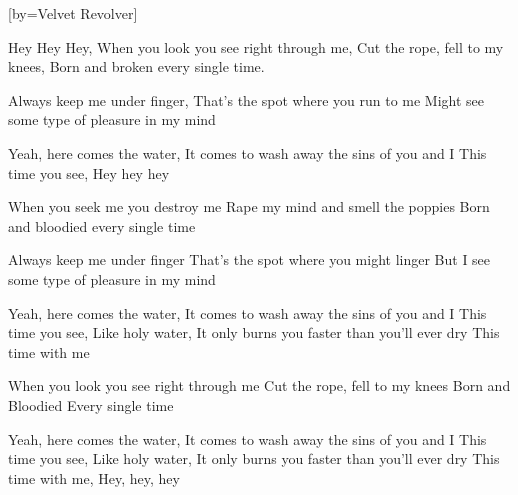 

[by=Velvet Revolver]


\beginverse
Hey Hey Hey, When you look you see right through me,
Cut the rope, fell to my knees, Born and broken every single time.

Always keep me under finger, That's the spot where you run to me
Might see some type of pleasure in my mind
\endverse

\beginverse
Yeah, here comes the water, It comes to wash away the sins of you and I
This time you see, Hey hey hey
\endverse

\beginverse
When you seek me you destroy me
Rape my mind and smell the poppies
Born and bloodied every single time

Always keep me under finger
That's the spot where you might linger
But I see some type of pleasure in my mind
\endverse

\beginverse
Yeah, here comes the water, It comes to wash away the sins of you and I
This time you see, Like holy water, It only burns you faster than you'll ever dry
This time with me
\endverse

\endverse

\beginverse
When you look you see right through me
Cut the rope, fell to my knees
Born and Bloodied
Every single time
\endverse

\beginverse
Yeah, here comes the water, It comes to wash away the sins of you and I
This time you see, Like holy water, It only burns you faster than you'll ever dry
This time with me, Hey, hey, hey
\endverse



\chordson
\endsong
